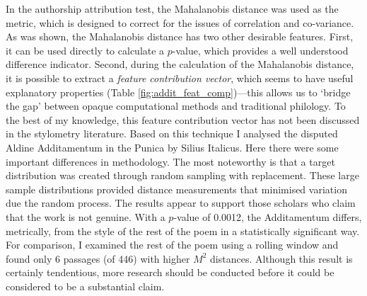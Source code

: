 \documentclass[11pt,a4paper]{scrartcl} %
\begin{document}
{In the authorship attribution test, the Mahalanobis distance was used as the metric, which is designed to correct for the issues of correlation and co-variance. As was shown, the Mahalanobis distance has two other desirable features. First, it can be used directly to calculate a $p$-value, which provides a well understood difference indicator. Second, during the calculation of the Mahalanobis distance, it is possible to extract a \textit{feature contribution vector}, which seems to have useful explanatory properties (Table \ref{fig:addit_feat_comp})---this allows us to `bridge the gap' between opaque computational methods and traditional philology. To the best of my knowledge, this feature contribution vector has not been discussed in the stylometry literature. Based on this technique I analysed the disputed Aldine Additamentum in the Punica by Silius Italicus. Here there were some important differences in methodology. The most noteworthy is that a target distribution was created through random sampling with replacement. These large sample distributions provided distance measurements that minimised variation due the random process. The results appear to support those scholars who claim that the work is not genuine. With a $p$-value of 0.0012, the Additamentum differs, metrically, from the style of the rest of the poem in a statistically significant way. For comparison, I examined the rest of the poem using a rolling window and found only 6 passages (of 446) with higher $M^{2}$ distances. Although this result is certainly tendentious, more research should be conducted before it could be considered to be a substantial claim.
\newpage
}
\end{document}
